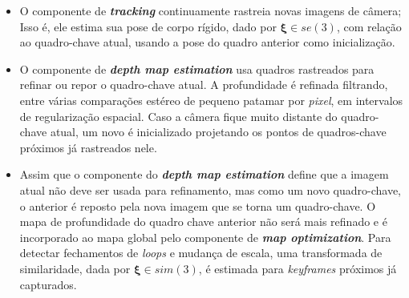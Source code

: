 \begin{itemize}
	\item{O componente de \textbf{\textit{tracking}} continuamente rastreia novas imagens de câmera; Isso é, ele estima sua pose de corpo rígido, dado por $\mathbf{\xi} \in se(3)$, com relação ao quadro-chave atual, usando a pose do quadro anterior como inicialização.}
	\item{O componente de \textbf{\textit{depth map estimation}} usa quadros rastreados para refinar ou repor o quadro-chave atual. A profundidade é refinada filtrando, entre várias comparações estéreo de pequeno patamar por \textit{pixel}, em intervalos de regularização espacial. Caso a câmera fique muito distante do quadro-chave atual, um novo é inicializado projetando os pontos de quadros-chave próximos já rastreados nele.}
	\item{Assim que o componente do \textbf{\textit{depth map estimation}} define que a imagem atual não deve ser usada para refinamento, mas como um novo quadro-chave, o anterior é reposto pela nova imagem que se torna um quadro-chave. O mapa de profundidade do quadro chave anterior não será mais refinado e é incorporado ao mapa global pelo componente de \textbf{\textit{map optimization}}. Para detectar fechamentos de \textit{loops} e mudança de escala, uma transformada de similaridade, dada por $\mathbf{\xi} \in sim(3)$, é estimada para \textit{keyframes} próximos já capturados.}
\end{itemize}	